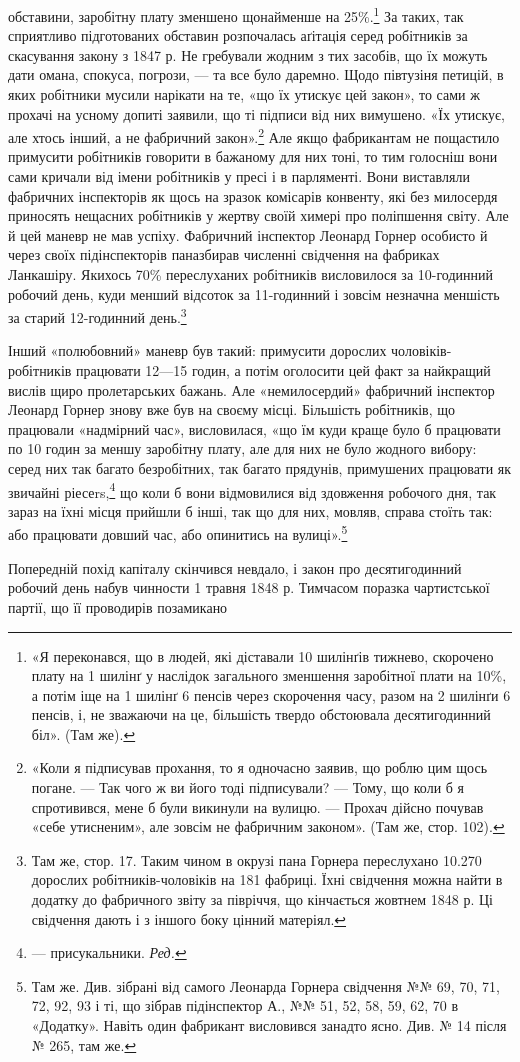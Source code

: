 обставини, заробітну плату зменшено щонайменше на 25\%.\footnote{
«Я переконався, що в людей, які діставали 10 шилінґів тижнево,
скорочено плату на 1 шилінґ у наслідок загального зменшення заробітної
плати на 10\%, а потім іще на 1 шилінґ 6 пенсів через скорочення часу,
разом на 2 шилінґи 6 пенсів, і, не зважаючи на це, більшість твердо обстоювала
десятигодинний біл». (Там же).
}
За таких, так сприятливо підготованих обставин розпочалась
аґітація серед робітників за скасування закону з 1847 р. Не гребували
жодним з тих засобів, що їх можуть дати омана, спокуса,
погрози, — та все було даремно. Щодо півтузіня петицій, в яких
робітники мусили нарікати на те, «що їх утискує цей закон», то
сами ж прохачі на усному допиті заявили, що ті підписи від них
вимушено. «Їх утискує, але хтось інший, а не фабричний закон».\footnote{
«Коли я підписував прохання, то я одночасно заявив, що роблю
цим щось погане. — Так чого ж ви його тоді підписували? — Тому, що коли б
я спротивився, мене б були викинули на вулицю. — Прохач дійсно почував
«себе утисненим», але зовсім не фабричним законом». (Там же, стор. 102).
}
Але якщо фабрикантам не пощастило примусити робітників
говорити в бажаному для них тоні, то тим голосніш вони сами
кричали від імени робітників у пресі і в парляменті. Вони виставляли
фабричних інспекторів як щось на зразок комісарів конвенту,
які без милосердя приносять нещасних робітників у жертву
своїй химері про поліпшення світу. Але й цей маневр не мав
успіху. Фабричний інспектор Леонард Горнер особисто й через
своїх підінспекторів паназбирав численні свідчення на фабриках
Ланкашіру. Якихось 70\% переслуханих робітників висловилося
за 10-годинний робочий день, куди менший відсоток за 11-годинний
і зовсім незначна меншість за старий 12-годинний день.\footnote{
Там же, стор. 17. Таким чином в окрузі пана Горнера переслухано
10.270 дорослих робітників-чоловіків на 181 фабриці. Їхні свідчення
можна найти в додатку до фабричного звіту за півріччя, що кінчається
жовтнем 1848 р. Ці свідчення дають і з іншого боку цінний матеріял.
}

Інший «полюбовний» маневр був такий: примусити дорослих
чоловіків-робітників працювати 12—15 годин, а потім оголосити
цей факт за найкращий вислів щиро пролетарських бажань.
Але «немилосердий» фабричний інспектор Леонард Горнер знову
вже був на своєму місці. Більшість робітників, що працювали
«надмірний час», висловилася, «що їм куди краще було б працювати
по 10 годин за меншу заробітну плату, але для них не було
жодного вибору: серед них так багато безробітних, так багато
прядунів, примушених працювати як звичайні ріесеrs,\footnote*{
— присукальники. \emph{Ред.}
} що
коли б вони відмовилися від здовження робочого дня, так зараз
на їхні місця прийшли б інші, так що для них, мовляв, справа
стоїть так: або працювати довший час, або опинитись на вулиці».\footnote{
Там же. Див. зібрані від самого Леонарда Горнера свідчення
№№ 69, 70, 71, 72, 92, 93 і ті, що зібрав підінспектор А., №№ 51, 52,
58, 59, 62, 70 в «Додатку». Навіть один фабрикант висловився занадто
ясно. Див. № 14 після № 265, там же.
}

Попередній похід капіталу скінчився невдало, і закон про десятигодинний
робочий день набув чинности 1 травня 1848 р. Тимчасом
поразка чартистської партії, що її проводирів позамикано